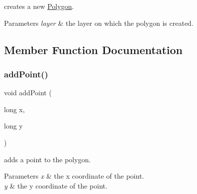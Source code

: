 creates a new \mbox{\hyperlink{class_c_i_f_1_1_polygon}{Polygon}}. 


\begin{DoxyParams}{Parameters}
{\em layer} & the layer on which the polygon is created. \\
\hline
\end{DoxyParams}


\subsection{Member Function Documentation}
\mbox{\label{class_c_i_f_1_1_polygon_ab3047469780327f18539907e1303ea15}} 
\subsubsection{\texorpdfstring{add\+Point()}{addPoint()}}
{\footnotesize\ttfamily void add\+Point (\begin{DoxyParamCaption}\item[{long}]{x,  }\item[{long}]{y }\end{DoxyParamCaption})}



adds a point to the polygon. 


\begin{DoxyParams}{Parameters}
{\em x} & the x coordinate of the point. \\
\hline
{\em y} & the y coordinate of the point. \\
\hline
\end{DoxyParams}
